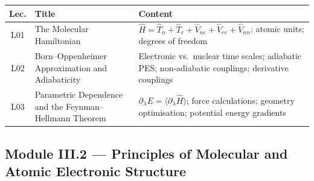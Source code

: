 \documentclass[11pt,a4paper]{article}
\begin{document}
\begin{tcolorbox}[chembox, title={Module~III.1 --- Lecture Overview}]
\begin{longtable}{clp{8cm}}
\toprule
\textbf{Lec.} & \textbf{Title} & \textbf{Content}\\
\midrule
\endhead
L01 & The Molecular Hamiltonian &
     $\hat{H}=\hat{T}_n+\hat{T}_e+\hat{V}_{ne}+\hat{V}_{ee}+\hat{V}_{nn}$;
     atomic units; degrees of freedom\\
L02 & Born--Oppenheimer Approximation and Adiabaticity &
     Electronic vs.\ nuclear time scales; adiabatic PES;
     non-adiabatic couplings; derivative couplings\\
L03 & Parametric Dependence and the Feynman--Hellmann Theorem &
     $\partial_\lambda E = \langle\partial_\lambda\hat{H}\rangle$;
     force calculations; geometry optimisation; potential energy gradients\\
\bottomrule
\end{longtable}
\end{tcolorbox}

\subsection{Module III.2 --- Principles of Molecular and Atomic Electronic Structure}
\label{sec:mod-III2}
\end{document}
